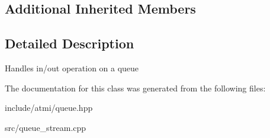 \subsection*{Additional Inherited Members}


\subsection{Detailed Description}
Handles in/out operation on a queue 

The documentation for this class was generated from the following files\+:\begin{DoxyCompactItemize}
\item 
include/atmi/queue.\+hpp\item 
src/queue\+\_\+stream.\+cpp\end{DoxyCompactItemize}
